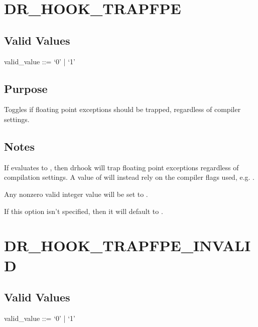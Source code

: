 \documentclass[letterpaper,10pt,english]{sphinxmanual}
\begin{document}
\section{DR\_HOOK\_TRAPFPE}
\label{\detokenize{flag/flag:dr-hook-trapfpe}}\label{\detokenize{flag/flag:id158}}

\subsection{Valid Values}
\label{\detokenize{flag/flag:id159}}
\begin{DUlineblock}{0em}
\item[] valid\_value ::= ‘0’ | ‘1’
\end{DUlineblock}


\subsection{Purpose}
\label{\detokenize{flag/flag:id160}}
\sphinxAtStartPar
Toggles if floating point exceptions should be trapped, regardless of compiler settings.


\subsection{Notes}
\label{\detokenize{flag/flag:id161}}
\sphinxAtStartPar
If  evaluates to , then drhook will trap floating point exceptions regardless of compilation settings. A value of  will instead rely on the compiler flags used, e.g. .

\sphinxAtStartPar
Any non\sphinxhyphen{}zero valid integer value will be set to .

\sphinxAtStartPar
If this option isn’t specified, then it will default to .


\section{DR\_HOOK\_TRAPFPE\_INVALID}
\label{\detokenize{flag/flag:dr-hook-trapfpe-invalid}}\label{\detokenize{flag/flag:id164}}

\subsection{Valid Values}
\label{\detokenize{flag/flag:id165}}
\begin{DUlineblock}{0em}
\item[] valid\_value ::= ‘0’ | ‘1’
\end{DUlineblock}
\end{document}
